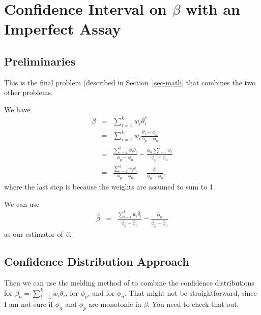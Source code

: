 \documentclass{article}
\begin{document}

\section{Confidence Interval on $\beta$ with an Imperfect Assay}
\label{sec-betaImperfect}


\subsection{Preliminaries}

This is the final problem (described in Section~\ref{sec-math} that combines the two other problems.

We have
\begin{eqnarray*}
\beta & = & \sum_{i=1}^{k} w_i \theta_i^*  \\
& = &  \sum_{i=1}^{k} w_i  \frac{ \theta_i - \phi_n }{ \phi_p - \phi_n} \\
& = &   \frac{ \sum_{i=1}^{k} w_i  \theta_i  }{ \phi_p - \phi_n} - \frac{ \phi_n \sum_{i=1}^{k} w_i    }{ \phi_p - \phi_n} \\
& = &   \frac{ \sum_{i=1}^{k} w_i  \theta_i  }{ \phi_p - \phi_n} - \frac{ \phi_n     }{ \phi_p - \phi_n},
\end{eqnarray*}
where the last step is because the weights are assumed to sum to 1.

We can use
\begin{eqnarray*}
\hat{\beta} & = &   \frac{ \sum_{i=1}^{k} w_i  \hat{\theta}_i  }{ \hat{\phi}_p - \hat{\phi}_n} - \frac{ \hat{\phi}_n   }{ \hat{\phi}_p - \hat{\phi}_n} 
\end{eqnarray*}
as our estimator of $\beta$. 

\subsection{Confidence Distribution Approach}

Then we can use the melding method of \citet{FayP:2015} to combine the confidence distributions for $\beta_a = \sum_{i=1}^{k} w_i  {\theta}_i$, for $\phi_p$,
and for $\phi_n$. That might not be straightforward, since I am not sure if $\phi_n$ and $\phi_p$ are monotonic in $\beta$. You need to check that out.
\end{document}
